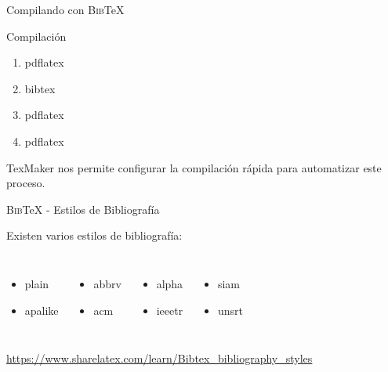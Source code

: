 \documentclass[11pt]{beamer}
\newcommand{\BibTeX}{\textsc{Bib}\TeX{}}
\begin{document}
\begin{frame}[fragile]{Compilando con \BibTeX{}}

\begin{block}{Compilación}
\begin{enumerate}
\item pdflatex
\item bibtex
\item pdflatex
\item pdflatex
\end{enumerate}
\end{block}

\vspace{1em}

TexMaker nos permite configurar la compilación rápida para automatizar este proceso.

\end{frame}


\begin{frame}[fragile]{\BibTeX{} - Estilos de Bibliografía}

Existen varios estilos de bibliografía:

\begin{columns}
\begin{itemize}
\item plain
\item apalike
\end{itemize}
\begin{itemize}
\item abbrv
\item acm
\end{itemize}
\begin{itemize}
\item alpha
\item ieeetr
\end{itemize}
\begin{itemize}
\item siam
\item unsrt
\end{itemize}
\end{columns}

\vspace{2em}

{\footnotesize \url{https://www.sharelatex.com/learn/Bibtex_bibliography_styles}}

\end{frame}
\end{document}
